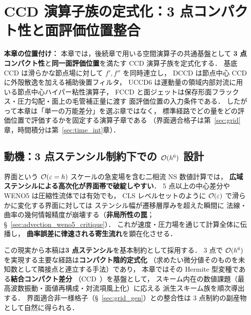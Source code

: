 \section{CCD 演算子族の定式化：3 点コンパクト性と面評価位置整合}
\label{sec:strategy}
\label{sec:CCD}

\noindent\textbf{本章の位置付け：}
本章では，後続章で用いる空間演算子の共通基盤として
\textbf{3 点コンパクト性}と\textbf{同一面評価位置}を満たす CCD 演算子族を定式化する．
基底 CCD は滑らかな節点場に対して $f',f''$ を同時連立し，
DCCD は節点中心 CCD に外殻散逸を加える補助後置フィルタ，
UCCD6 は運動量の領域内部対流に用いる節点中心ハイパー粘性演算子，
FCCD と面ジェットは保存形面フラックス・圧力勾配・面上の毛管補正量に渡す
面評価位置の入力条件である．
したがって本章は「単一の万能差分」を選ぶ章ではなく，
標準経路でどの量をどの評価位置で評価するかを固定する演算子章である
（界面適合格子は第~\ref{sec:grid}章，時間積分は第~\ref{sec:time_int}章）．

\label{sec:notation_glossary}%
\label{sec:tech_roadmap}%

\subsection{動機：3 点ステンシル制約下での \texorpdfstring{$\mathcal{O}(h^6)$}{O(h\^{}6)} 設計}
\label{sec:locality}

界面という $\mathcal{O}(\varepsilon=h)$ スケールの急変場を含む二相流 NS 数値計算では，
\textbf{広域ステンシルによる高次化が界面帯で破綻しやすい}．
5 点以上の中心差分や WENO5 は圧縮性流体では有効でも，
CLS レベルセットのように
$\mathcal{O}(\varepsilon)$ で滑らかに変化する界面に対しては
ステンシル幅が遷移層厚みを超えた瞬間に
法線・曲率の幾何情報精度が崩壊する（\textbf{非局所性の罠}；
§~\ref{sec:advection_weno5_critique}）．
これが速度・圧力場を通じて計算全体に伝播し，
\textbf{曲率誤差に律速される寄生流れ}を顕在化させる．

\medskip\noindent
この現実から本稿は\textbf{3 点ステンシル}を基本制約として採用する．
3 点で $\mathcal{O}(h^6)$ を実現する主要な経路は\textbf{コンパクト陰的定式化}
（求めたい微分値そのものを未知数として隣接点と連立する手法）であり，
本章ではその Hermite 型変種である\textbf{結合コンパクト差分}
（CCD~\cite{ChuFan1998}）を基盤として，
スキーム内在の数値課題（最高波数振動・面値再構成・対流項風上化）に応える
派生スキーム族を順次導出する．
界面適合非一様格子（§~\ref{sec:grid_gen}）との整合性は
3 点制約の副産物として自然に得られる．

